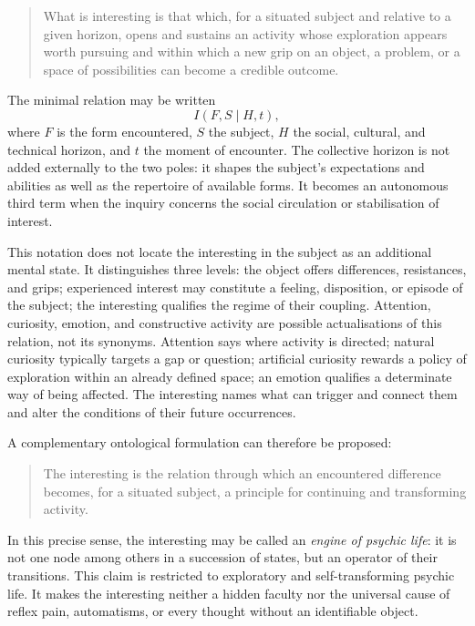 \documentclass[11pt,a4paper]{article}
\begin{document}
\begin{quote}
What is interesting is that which, for a situated subject and relative to a
given horizon, opens and sustains an activity whose exploration appears worth
pursuing and within which a new grip on an object, a problem, or a space of
possibilities can become a credible outcome.
\end{quote}

The minimal relation may be written
\[
  I(F,S\mid H,t),
\]
where \(F\) is the form encountered, \(S\) the subject, \(H\) the social,
cultural, and technical horizon, and \(t\) the moment of encounter. The
collective horizon is not added externally to the two poles: it shapes the
subject's expectations and abilities as well as the repertoire of available
forms. It becomes an autonomous third term when the inquiry concerns the social
circulation or stabilisation of interest.

This notation does not locate the interesting in the subject as an additional
mental state. It distinguishes three levels: the object offers differences,
resistances, and grips; experienced interest may constitute a feeling,
disposition, or episode of the subject; the interesting qualifies the regime of
their coupling. Attention, curiosity, emotion, and constructive activity are
possible actualisations of this relation, not its synonyms. Attention says
where activity is directed; natural curiosity typically targets a gap or
question; artificial curiosity rewards a policy of exploration within an
already defined space; an emotion qualifies a determinate way of being affected.
The interesting names what can trigger and connect them and alter the conditions
of their future occurrences.

A complementary ontological formulation can therefore be proposed:

\begin{quote}
The interesting is the relation through which an encountered difference becomes,
for a situated subject, a principle for continuing and transforming activity.
\end{quote}

In this precise sense, the interesting may be called an \emph{engine of psychic
life}: it is not one node among others in a succession of states, but an operator
of their transitions. This claim is restricted to exploratory and
self-transforming psychic life. It makes the interesting neither a hidden
faculty nor the universal cause of reflex pain, automatisms, or every thought
without an identifiable object.
\end{document}
